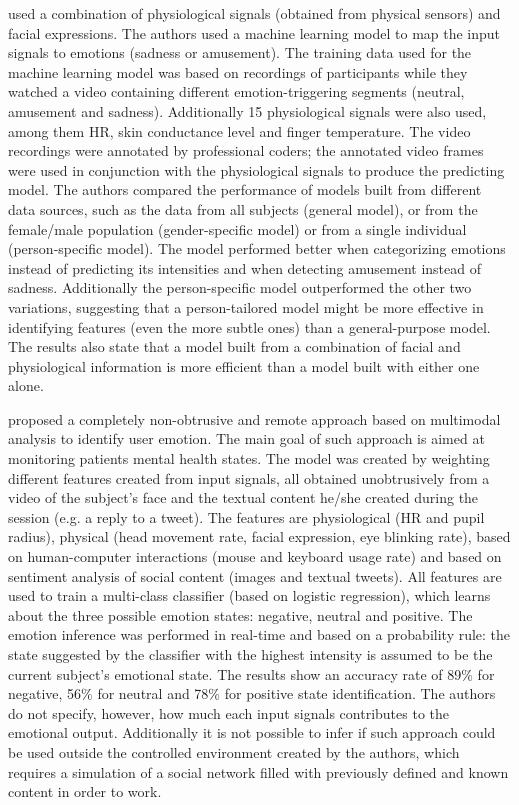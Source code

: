 \parencite{bailenson2008real} used a combination of physiological signals (obtained from physical sensors) and facial expressions. The authors used a machine learning model to map the input signals to emotions (sadness or amusement). The training data used for the machine learning model was based on recordings of participants while they watched a video containing different emotion-triggering segments (neutral, amusement and sadness). Additionally 15 physiological signals were also used, among them HR, skin conductance level and finger temperature. The video recordings were annotated by professional coders; the annotated video frames were used in conjunction with the physiological signals to produce the predicting model. The authors compared the performance of models built from different data sources, such as the data from all subjects (general model), or from the female/male population (gender-specific model) or from a single individual (person-specific model). The model performed better when categorizing emotions instead of predicting its intensities and when detecting amusement instead of sadness. Additionally the person-specific model outperformed the other two variations, suggesting that a person-tailored model might be more effective in identifying features (even the more subtle ones) than a general-purpose model. The results also state that a model built from a combination of facial and physiological information is more efficient than a model built with either one alone.

\textcite{mental} proposed a completely non-obtrusive and remote approach based on multimodal analysis to identify user emotion. The main goal of such approach is aimed at monitoring patients mental health states. The model was created by weighting different features created from input signals, all obtained unobtrusively from a video of the subject's face and the textual content he/she created during the session (e.g. a reply to a tweet). The features are physiological (HR and pupil radius), physical (head movement rate, facial expression, eye blinking rate), based on human-computer interactions (mouse and keyboard usage rate) and based on sentiment analysis of social content (images and textual tweets). All features are used to train a multi-class classifier (based on logistic regression), which learns about the three possible emotion states: negative, neutral and positive. The emotion inference was performed in real-time and based on a probability rule: the state suggested by the classifier with the highest intensity is assumed to be the current subject's emotional state. The results show an accuracy rate of 89\% for negative, 56\% for neutral and 78\% for positive state identification. The authors do not specify, however, how much each input signals contributes to the emotional output. Additionally it is not possible to infer if such approach could be used outside the controlled environment created by the authors, which requires a simulation of a social network filled with previously defined and known content in order to work.

